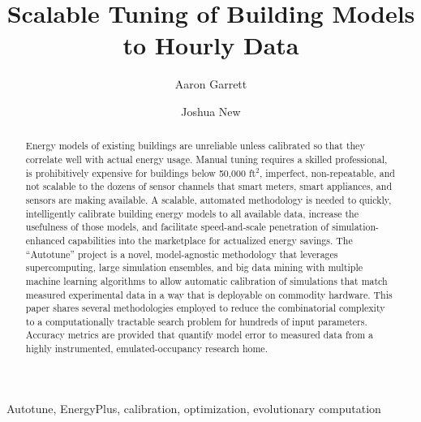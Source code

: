 \documentclass[preprint, review, 12pt]{elsarticle}
\begin{document}
\begin{frontmatter}

\title{Scalable Tuning of Building Models to Hourly Data}

\author[atr:garrett]{Aaron Garrett} %
\author[atr:new]{Joshua New}

\address[atr:garrett]{Mathematical, Computing, and Information Sciences, Jacksonville State University, Jacksonville, AL, USA}
\address[atr:new]{Oak Ridge National Laboratory, Oak Ridge, TN, USA}


\begin{abstract}
Energy models of existing buildings are unreliable unless calibrated so that they correlate well with actual energy usage. Manual tuning requires a skilled professional, is prohibitively expensive for buildings below 50,000 ft$^2$, imperfect, non-repeatable, and not scalable to the dozens of sensor channels that smart meters, smart appliances, and sensors are making available. A scalable, automated methodology is needed to quickly, intelligently calibrate building energy models to all available data, increase the usefulness of those models, and facilitate speed-and-scale penetration of simulation-enhanced capabilities into the marketplace for actualized energy savings. The ``Autotune'' project is a novel, model-agnostic methodology that leverages supercomputing, large simulation ensembles, and big data mining with multiple machine learning algorithms to allow automatic calibration of simulations that match measured experimental data in a way that is deployable on commodity hardware. This paper shares several methodologies employed to reduce the combinatorial complexity to a computationally tractable search problem for hundreds of input parameters. Accuracy metrics are provided that quantify model error to measured data from a highly instrumented, emulated-occupancy research home.
\end{abstract}

\begin{keyword}
Autotune, EnergyPlus, calibration, optimization, evolutionary computation
\end{keyword}

\end{frontmatter}

\end{document}
